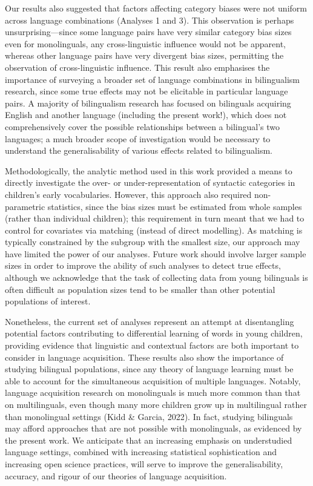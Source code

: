 \documentclass[10pt, letterpaper]{article}
\begin{document}
Our results also suggested that factors affecting category biases were
not uniform across language combinations (Analyses 1 and 3). This
observation is perhaps unsurprising---since some language pairs have
very similar category bias sizes even for monolinguals, any
cross-linguistic influence would not be apparent, whereas other language
pairs have very divergent bias sizes, permitting the observation of
cross-linguistic influence. This result also emphasises the importance
of surveying a broader set of language combinations in bilingualism
research, since some true effects may not be elicitable in particular
language pairs. A majority of bilingualism research has focused on
bilinguals acquiring English and another language (including the present
work!), which does not comprehensively cover the possible relationships
between a bilingual's two languages; a much broader scope of
investigation would be necessary to understand the generalisability of
various effects related to bilingualism.

Methodologically, the analytic method used in this work provided a means
to directly investigate the over- or under-representation of syntactic
categories in children's early vocabularies. However, this approach also
required non-parametric statistics, since the bias sizes must be
estimated from whole samples (rather than individual children); this
requirement in turn meant that we had to control for covariates via
matching (instead of direct modelling). As matching is typically
constrained by the subgroup with the smallest size, our approach may
have limited the power of our analyses. Future work should involve
larger sample sizes in order to improve the ability of such analyses to
detect true effects, although we acknowledge that the task of collecting
data from young bilinguals is often difficult as population sizes tend
to be smaller than other potential populations of interest.

Nonetheless, the current set of analyses represent an attempt at
disentangling potential factors contributing to differential learning of
words in young children, providing evidence that linguistic and
contextual factors are both important to consider in language
acquisition. These results also show the importance of studying
bilingual populations, since any theory of language learning must be
able to account for the simultaneous acquisition of multiple languages.
Notably, language acquisition research on monolinguals is much more
common than that on multilinguals, even though many more children grow
up in multilingual rather than monolingual settings (Kidd \& Garcia,
2022). In fact, studying bilinguals may afford approaches that are not
possible with monolinguals, as evidenced by the present work. We
anticipate that an increasing emphasis on understudied language
settings, combined with increasing statistical sophistication and
increasing open science practices, will serve to improve the
generalisability, accuracy, and rigour of our theories of language
acquisition.
\end{document}
